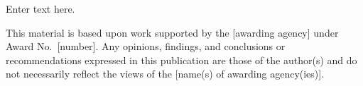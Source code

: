 
Enter text here.

This material is based upon work supported by the [awarding agency] under
Award No.~[number].
Any opinions, findings, and conclusions or recommendations expressed in this
publication are those of the author(s) and do not necessarily reflect the
views of the [name(s) of awarding agency(ies)].
